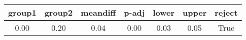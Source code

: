 \begin{tabular}{|c|c|c|c|c|c|c|}
\toprule
 group1 &  group2 &  meandiff &  p-adj &  lower &  upper &  reject \\
\midrule
   0.00 &    0.20 &      0.04 &   0.00 &   0.03 &   0.05 &    True \\
\bottomrule
\end{tabular}

